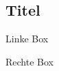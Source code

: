 \begin{dsaCharacterSheet}
   \section*{Titel}
   \begin{multicols}{2}
      \begin{dsaSheetBox}[8.5cm]
         Linke Box \vspace{40pt}
      \end{dsaSheetBox}
      \columnbreak
      \begin{dsaSheetBox}[8.5cm]
         Rechte Box \vspace{40pt}
      \end{dsaSheetBox}
   \end{multicols}
\end{dsaCharacterSheet}